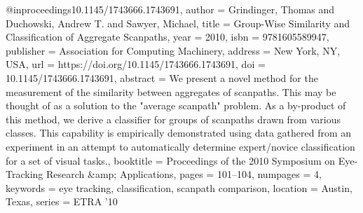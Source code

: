@inproceedings{10.1145/1743666.1743691,
author = {Grindinger, Thomas and Duchowski, Andrew T. and Sawyer, Michael},
title = {Group-Wise Similarity and Classification of Aggregate Scanpaths},
year = {2010},
isbn = {9781605589947},
publisher = {Association for Computing Machinery},
address = {New York, NY, USA},
url = {https://doi.org/10.1145/1743666.1743691},
doi = {10.1145/1743666.1743691},
abstract = {We present a novel method for the measurement of the similarity between aggregates of scanpaths. This may be thought of as a solution to the "average scanpath" problem. As a by-product of this method, we derive a classifier for groups of scanpaths drawn from various classes. This capability is empirically demonstrated using data gathered from an experiment in an attempt to automatically determine expert/novice classification for a set of visual tasks.},
booktitle = {Proceedings of the 2010 Symposium on Eye-Tracking Research &amp; Applications},
pages = {101–104},
numpages = {4},
keywords = {eye tracking, classification, scanpath comparison},
location = {Austin, Texas},
series = {ETRA '10}
}